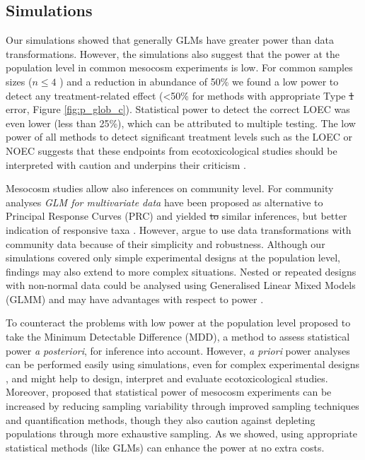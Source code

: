 \documentclass[twocolumn, natbib]{svjour3}
\providecommand{\DIFadd}[1]{{\protect\color{blue}\uwave{#1}}} %
\providecommand{\DIFdel}[1]{{\protect\color{red}\sout{#1}}}                      %
\providecommand{\DIFaddbegin}{} %
\providecommand{\DIFaddend}{} %
\providecommand{\DIFdelbegin}{} %
\providecommand{\DIFdelend}{} %
\begin{document}
\subsection{Simulations}
Our simulations showed that generally GLMs have greater power than data transformations.
However, the simulations also suggest that the power at the population level in common mesocosm experiments is low.
For common samples sizes ($n \le 4$ ) and a reduction in abundance of 50\% we found a low power to detect any treatment-related effect (\textless 50\% for methods with appropriate Type \DIFdelbegin \DIFdel{1 }\DIFdelend \DIFaddbegin \DIFadd{I }\DIFaddend error, Figure \ref{fig:p_glob_c}).
Statistical power to detect the correct LOEC was even lower (less than 25\%), which can be attributed to multiple testing.
The low power of all methods to detect significant treatment levels such as the LOEC or NOEC suggests that these endpoints from ecotoxicological studies should be interpreted with caution and underpins their criticism \citep{laskowski_good_1995,landis_well_2011}.

Mesocosm studies allow also inferences on community level. 
For community analyses \emph{GLM for multivariate data} \citep{warton_distance-based_2012} have been proposed as alternative to Principal Response Curves (PRC) and yielded \DIFdelbegin \DIFdel{to }\DIFdelend similar inferences, but better indication of responsive taxa \citep{szocs_analysing_2015}. 
However, \citet{ter_braak_topics_2014} argue to use data transformations with community data because of their simplicity and robustness.
Although our simulations covered only simple experimental designs at the population level, findings may also extend to more complex situations. 
Nested or repeated designs with non-normal data could be analysed using Generalised Linear Mixed Models (GLMM) and may have advantages with respect to power \citep{stroup_rethinking_2014}.

To counteract the problems with low power at the population level \citet{brock_minimum_2015} proposed to take the Minimum Detectable Difference (MDD), a method to assess statistical power \emph{a posteriori}, for inference into account.
However, \emph{a priori} power analyses can be performed easily using simulations, even for complex experimental designs \citep{johnson_power_2014}, and might help to design, interpret and evaluate ecotoxicological studies.
Moreover, \citet{brock_minimum_2015} proposed that statistical power of mesocosm experiments can be increased by reducing sampling variability through improved sampling techniques and quantification methods, though they also caution against depleting populations through more exhaustive sampling.
As we showed, using appropriate statistical methods (like GLMs) can enhance the power at no extra costs.
\end{document}
